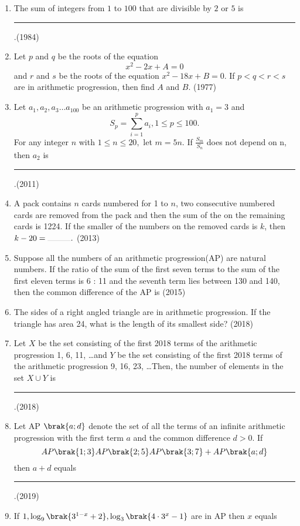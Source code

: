 \begin{enumerate}    [label=\thesubsection.\arabic*, ref=\thesubsection.\theenumi]
%
\item  The sum of integers from $1$ to $100$ that are divisible by $2$ or $5$ is \rule{1cm}{0.1pt}.\hfill{(1984)}
		  \item  Let $p$ and $q$ be the roots of the equation                    $${x^2-2x+A=0}$$ and $r$ and $s$ be the roots of the                     equation ${x^2-18x+B=0}$. If ${p<q<r<s}$ are                                      in arithmetic progression,  then find $A$ and $B$. \hfill{(1977)}
\item Let $a_{1},  a_{2},  a_{3}\dots a_{100}$ be an arithmetic progression with $a_{1}= 3$ and $$S_{p} =\sum\limits_{i=1}^{p} a_{i}, 1\leq p\leq 100.$$ For any integer $n$ with $1 \leq n \leq 20, $ let $m= 5n$. If $\frac{S_{m}}{S_{n}}$ does not depend on n,  then $a_{2}$ is \rule{1cm}{0.1pt}.\hfill(2011)
%
   \item A pack contains $n$ cards numbered for 1 to $n$,  two consecutive numbered cards are removed from the pack and then the sum of the on the remaining cards is 1224. If the smaller of the numbers on the removed cards is $k$,  then $k - 20=\rule{1cm}{0.1pt}.$ \hfill(2013)
   \item Suppose all the numbers of an arithmetic progression(AP) are natural numbers. If the ratio of the sum of the first seven terms to the sum of the first eleven terms is 6 : 11 and the seventh term lies between 130 and 140,  then the common difference of the AP is 
    \hfill(2015)
%
   \item The sides of a right angled triangle are in arithmetic progression. If the triangle has area 24,  what is the length of its smallest side? 
%   
   \hfill(2018)
%
   \item Let $X$ be the set consisting of the first 2018 terms of the arithmetic progression 1,  6,  11,  \dots  and $Y$ be the set consisting of the first 2018 terms of the arithmetic progression 9,  16,  23,  \dots Then,  the number of elements in the set $ X \cup Y $ is \rule{1cm}{0.1pt}.\hfill(2018)
   \item Let AP $\brak{a; d}$ denote the set of all the terms of an infinite arithmetic progression with the first term $a$ and the common difference $d>0$. If $$AP\brak{1; 3}AP\brak{2; 5}AP\brak{3; 7}+AP\brak{a; d}$$ then $a + d$ equals \rule{1cm}{0.1pt}.\hfill(2019)
%   
	\item {If $ 1,  \log_9 \brak{3^{1-x} +2},  \log_3 \brak{4\cdot3^x -1}$ are in AP then $x$ equals}

\end{enumerate}
